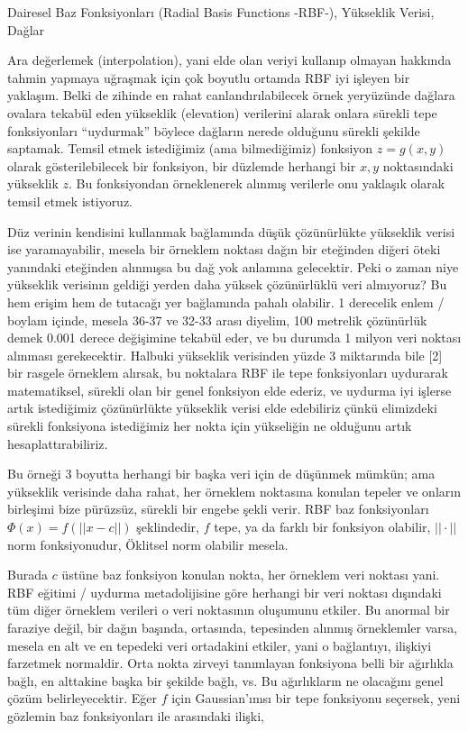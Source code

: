 \documentclass[12pt,fleqn]{article}\usepackage{../../common}
\begin{document}
Dairesel Baz Fonksiyonları (Radial Basis Functions -RBF-), Yükseklik Verisi, Dağlar

Ara değerlemek (interpolation), yani elde olan veriyi kullanıp olmayan hakkında
tahmin yapmaya uğraşmak için çok boyutlu ortamda RBF iyi işleyen bir
yaklaşım. Belki de zihinde en rahat canlandırılabilecek örnek yeryüzünde dağlara
ovalara tekabül eden yükseklik (elevation) verilerini alarak onlara sürekli tepe
fonksiyonları ``uydurmak'' böylece dağların nerede olduğunu sürekli şekilde
saptamak. Temsil etmek istediğimiz (ama bilmediğimiz) fonksiyon $z=g(x,y)$
olarak gösterilebilecek bir fonksiyon, bir düzlemde herhangi bir $x,y$
noktasındaki yükseklik $z$. Bu fonksiyondan örneklenerek alınmış verilerle onu
yaklaşık olarak temsil etmek istiyoruz.

Düz verinin kendisini kullanmak bağlamında düşük çözünürlükte yükseklik verisi
ise yaramayabilir, mesela bir örneklem noktası dağın bir eteğinden diğeri öteki
yanındaki eteğinden alınmışsa bu dağ yok anlamına gelecektir. Peki o zaman niye
yükseklik verisinın geldiği yerden daha yüksek çözünürlüklü veri almıyoruz?  Bu
hem erişim hem de tutacağı yer bağlamında pahalı olabilir. 1 derecelik enlem /
boylam içinde, mesela 36-37 ve 32-33 arası diyelim, 100 metrelik çözünürlük
demek 0.001 derece değişimine tekabül eder, ve bu durumda 1 milyon veri noktası
alınması gerekecektir. Halbuki yükseklik verisinden yüzde 3 miktarında bile [2]
bir rasgele örneklem alırsak, bu noktalara RBF ile tepe fonksiyonları uydurarak
matematiksel, sürekli olan bir genel fonksiyon elde ederiz, ve uydurma iyi
işlerse artık istediğimiz çözünürlükte yükseklik verisi elde edebiliriz çünkü
elimizdeki sürekli fonksiyona istediğimiz her nokta için yükseliğin ne olduğunu
artık hesaplattırabiliriz. 

Bu örneği 3 boyutta herhangi bir başka veri için de düşünmek mümkün; ama
yükseklik verisinde daha rahat, her örneklem noktasına konulan tepeler ve
onların birleşimi bize pürüzsüz, sürekli bir engebe şekli verir. RBF baz
fonksiyonları $\Phi(x) = f(||x-c||)$ şeklindedir, $f$ tepe, ya da farklı bir
fonksiyon olabilir, $||\cdot||$ norm fonksiyonudur, Öklitsel norm olabilir
mesela.

Burada $c$ üstüne baz fonksiyon konulan nokta, her örneklem veri noktası
yani. RBF eğitimi / uydurma metadolijisine göre herhangi bir veri noktası
dışındaki tüm diğer örneklem verileri o veri noktasının oluşumunu etkiler. Bu
anormal bir faraziye değil, bir dağın başında, ortasında, tepesinden alınmış
örneklemler varsa, mesela en alt ve en tepedeki veri ortadakini etkiler, yani o
bağlantıyı, ilişkiyi farzetmek normaldir. Orta nokta zirveyi tanımlayan
fonksiyona belli bir ağırlıkla bağlı, en alttakine başka bir şekilde bağlı,
vs. Bu ağırlıkların ne olacağını genel çözüm belirleyecektir. Eğer $f$ için
Gaussian'ımsı bir tepe fonksiyonu seçersek, yeni gözlemin baz fonksiyonları ile
arasındaki ilişki,
\end{document}
